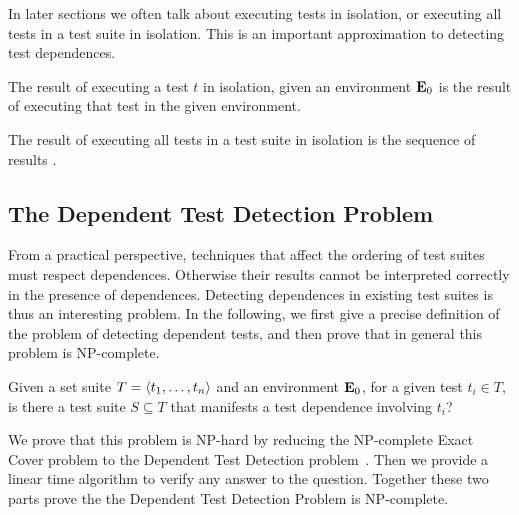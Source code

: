 In later sections we often talk about executing tests in isolation, or
executing all tests in a test suite in isolation. This is an important
approximation to detecting test dependences.


\begin{definition}
The result of executing a test\/ $t$ in isolation, given an
environment\/
$\mathbf{E}_0$ is the result\/  of executing that test in
the given environment.  

The result of executing all tests in a test suite\/  in isolation is the
sequence of results\/ .
\end{definition}


\subsection{The Dependent Test Detection Problem}

From a practical perspective, techniques that affect the ordering of
test suites must respect dependences. Otherwise their results cannot
be interpreted correctly in the presence of dependences. Detecting
dependences in existing test suites is thus an interesting problem.
In the following, we first give a precise definition of the problem of
detecting dependent tests, and then prove that in general this problem
is NP-complete. 


\begin{definition}
Given a set suite\/ $T =  \langle t_1, \dots, t_n \rangle $ and an environment\/
$\mathbf{E}_0$, for a given test\/ $t_i \in T$, is there a test suite\/ $S
\subseteq T$ that manifests a test dependence involving\/ $t_i$? 
\end{definition}

We prove that this problem is NP-hard by reducing the NP-complete Exact Cover problem
to the Dependent Test Detection
problem~\cite{karp:NP:1972}. 
Then we provide a linear time algorithm to verify any answer to the
question.
Together these two parts prove the the Dependent Test Detection Problem is NP-complete.

